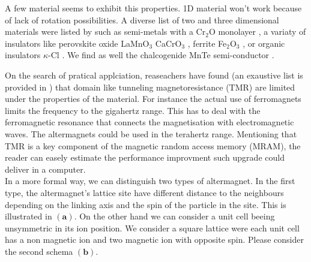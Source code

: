 \documentclass[../main.tex]{main.tex}
\begin{document}
A few material seems to exhibit this properties. 1D material won't work because of lack of rotation possibilities. A diverse list of two and three dimensional 
materials were listed by \cite{Smejkal2022} such as semi-metals with a Cr$_2$O monolayer \cite{Chen_2023}, a variaty of insulators like 
 perovskite oxide LaMnO$_3$ \cite{Yuan2021} CaCrO$_3$ \cite{Naka2021}, ferrite  Fe$_2$O$_3$ \cite{Smejkal2022_2}, or organic insulators $\kappa$-Cl \cite{Naka2019}.
We find as well the chalcogenide MnTe semi-conductor \cite{Smejkal2022_2}.

On the search of pratical applciation, reaseachers have found (an exaustive list is provided in \cite{Mazin2024}) that
domain like tunneling magnetoresistance (TMR) are limited under the properties of the material. For instance the actual use 
of ferromagnets limits the frequency to the gigahertz range. This has to deal with the ferromagnetic resonance that connects 
the magnetisation with electromagnetic waves. The altermagnets could be used in the terahertz range.
Mentioning that TMR is a key component of the magnetic random access memory (MRAM), the reader can easely estimate the performance
improvment such upgrade could deliver in a computer.\\
 
In a more formal way, we can
distinguish two types of altermagnet.
In the first type, the altermagnet's lattice site have different distance to the neighbours depending on the linking axis and the 
spin of the particle in the site. This is illustrated in $(\bm{a})$. On the other hand we can consider a unit cell beeing unsymmetric
in its ion position. We consider a square lattice were each unit cell has a non magnetic ion and two magnetic ion with opposite spin.
Please consider the second schema $(\bm{b})$.\\
\end{document}
